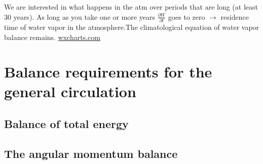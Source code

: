We are interested in what happens in the atm over periods that are long (at least 30 years). As long as you take one or more years $\frac{\partial W}{\partial t}$ goes to zero $\rightarrow$ residence time of water vapor in the atmosphere.The climatological equation of water vapor balance remains.
\url{wxcharts.com}










\section{Balance requirements for the general circulation}
\subsection{Balance of total energy}

\subsection{The angular momentum balance}

